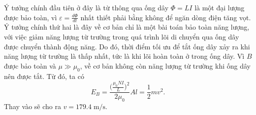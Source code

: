 \begin{solution}
Ý tưởng chính đầu tiên ở đây là từ thông qua ống dây \( \Phi = LI \) là một đại lượng được bảo toàn, vì \( \varepsilon = \frac{d \Phi}{dt} \) nhất thiết phải bằng không để ngăn dòng điện tăng vọt. Ý tưởng chính thứ hai là đây về cơ bản chỉ là một bài toán bảo toàn năng lượng, với việc giảm năng lượng từ trường trong quá trình lõi di chuyển qua ống dây được chuyển thành động năng. Do đó, thời điểm tối ưu để tắt ống dây xảy ra khi năng lượng từ trường là thấp nhất, tức là khi lõi hoàn toàn ở trong ống dây.
\newline
\newline
Vì $B$ được bảo toàn và  $\mu \gg \mu_0$, về cơ bản không còn năng lượng từ trường khi ống dây nên được tắt.
Từ đó, ta có
$$E_B = \frac{\bigg (\frac{\mu_0 N I}{L}\bigg )^2}{2 \mu_0}Al = {\frac{1}{2}}mv^2.$$
Thay vào sẽ cho ra $\boxed{v = 179.4 \;\mathrm{m/s}}$.
\end{solution}
